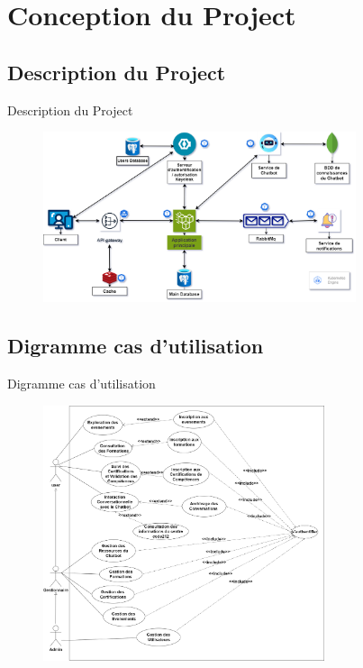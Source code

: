 \documentclass{beamer}
\begin{document}
\section{Conception du Project}
\subsection{Description du Project}
\begin{frame}{Description du Project}
\begin{figure}[htpb]
        \centering
        \includegraphics[height=5cm]{pic/Code212_architecture.drawio (1).png}
    \end{figure}

\end{frame}

\subsection{Digramme cas d'utilisation}
\begin{frame}{Digramme cas d'utilisation}
 \begin{figure}[htpb]
        \centering
        \includegraphics[height=7.5cm]{pic/usecase.png}
    \end{figure}
\end{frame}
\end{document}
